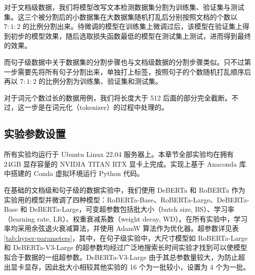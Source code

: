 对于文档级数据，我们将模型改写文本检测数据集分割为训练集、验证集与测试集。这三个被分割后的小数据集在大数据集随机打乱后分别按照文档的个数以 $7:1:2$ 的比例分割出来。待微调的模型在训练集上微调过后，该模型在验证集上得到初步的模型效果，随后选取损失函数最低的模型在测试集上测试，进而得到最终的效果。

而句子级数据中关于数据集的分割步骤也与文档级数据的分割步骤类似。只不过第一步需要先将所有句子分割出来，单独打上标签，按照句子的个数随机打乱顺序后再以 $7:1:2$ 的比例分割为训练集、验证集和测试集。

对于词元个数过长的数据用例，我们将长度大于 512 后面的部分完全截断。不过，这一步是在词元化（tokenizer）的过程中处理的。

\subsection{实验参数设置}
\label{sec:method-experiment-parameter}


所有实验均运行于 Ubuntu Linux 22.04 服务器上。本章节全部实验均在拥有 24GB 显存容量的 NVIDIA TITAN RTX 显卡上完成。实现上基于 Anaconda 库中搭建的 Conda 虚拟环境运行 Python 代码。

在基础的文档级和句子级的数据实验中，我们使用 DeBERTa 和 RoBERTa 作为实验用的模型并微调了四种模型：RoBERTa-Base、RoBERTa-Large、DeBERTa-Base 和 DeBERTa-Large，可变超参数包括批大小（batch size, BS）、学习率（learning rate, LR）、权重衰减系数（weight decay, WD）。在所有实验中，学习率均采用余弦退火衰减算法，并使用 AdamW 算法作为优化器。超参数详见表 \ref{tab:hyper-parameters}，其中，在句子级实验中，大尺寸模型如 RoBERTa-Large 和 DeBERTa-V3-Large 的超参数均经过广泛地搜索长时间实验才找到可以使模型拟合于数据的一组超参数。DeBERTa-V3-Large 由于其总参数量较大，为防止超出显卡显存，因此批大小相较其他实验的 16 个为一批较小，设置为 4 个为一批。

